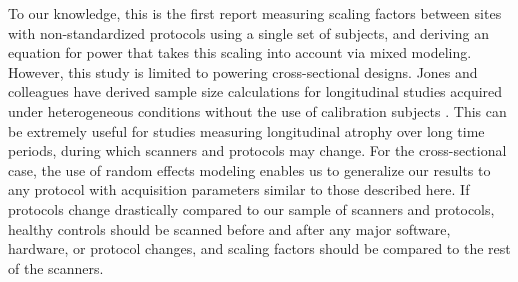 To our knowledge, this is the first report measuring scaling factors between sites with non-standardized protocols using a single set of subjects, and deriving an equation for power that takes this scaling into account via mixed modeling. However, this study is limited to powering cross-sectional designs. Jones and colleagues have derived sample size calculations for longitudinal studies acquired under heterogeneous conditions without the use of calibration subjects \cite{jones2013quantification}. This can be extremely useful for studies measuring longitudinal atrophy over long time periods, during which scanners and protocols may change. For the cross-sectional case, the use of random effects modeling enables us to generalize our results to any protocol with acquisition parameters similar to those described here. If protocols change drastically compared to our sample of scanners and protocols, healthy controls should be scanned before and after any major software, hardware, or protocol changes, and scaling factors should be compared to the rest of the scanners.